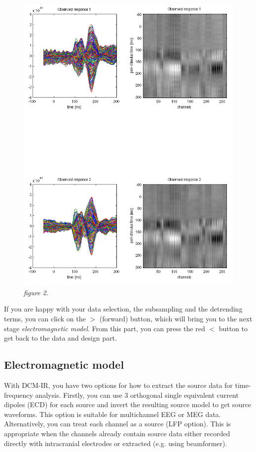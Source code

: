 \begin{figure}
\begin{center}
\includegraphics[width=160mm]{dcm_ir/figures/figure2}
\caption{\em  figure 2. \label{dcm-ir:fig:2}}
\end{center}
\end{figure}

If you are happy with your data selection, the subsampling and the detrending terms, you can click on the $>$ (forward) button, which will bring you to the next stage \textit{electromagnetic model}. From this part, you can press the red $<$ button to get back to the data and design part.

\subsection{Electromagnetic model}
With DCM-IR, you have two options for how to extract the source data for time-frequency analysis. Firstly, you can use 3 orthogonal single equivalent current dipoles (ECD) for each source and invert the resulting source model to get source waveforms. This option is suitable for multichannel EEG or MEG data. Alternatively, you can treat each channel as a source (LFP option). This is appropriate when the channels already contain source data either recorded directly with intracranial electrodes or extracted (e.g. using beamformer). 


